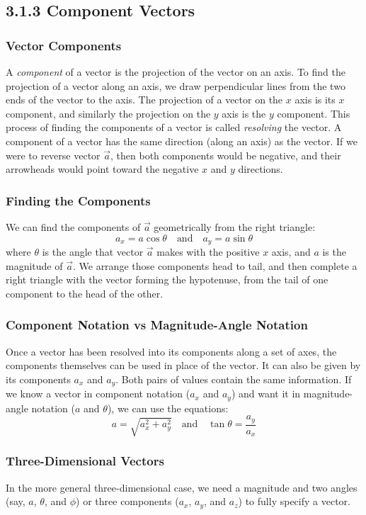 \documentclass{article}
\begin{document}
\subsection*{3.1.3 Component Vectors}
\subsubsection*{Vector Components}
A \textit{component} of a vector is the projection of the vector on an axis. To find the projection of a vector along an axis, we draw perpendicular lines from the two ends of the vector to the axis.
The projection of a vector on the $x$ axis is its $x$ component, and similarly the projection on the $y$ axis is the $y$ component.
This process of finding the components of a vector is called \textit{resolving} the vector.
A component of a vector has the same direction (along an axis) as the vector.
If we were to reverse vector $\vec{a}$, then both components would be negative, and their arrowheads would point toward the negative $x$ and $y$ directions.

\subsubsection*{Finding the Components}
We can find the components of $\vec{a}$ geometrically from the right triangle:
\[
a_x = a \cos \theta \quad \text{and} \quad a_y = a \sin \theta
\]
where $\theta$ is the angle that vector $\vec{a}$ makes with the positive $x$ axis, and $a$ is the magnitude of $\vec{a}$.
We arrange those components head to tail, and then complete a right triangle with the vector forming the hypotenuse, from the tail of one component to the head of the other.

\subsubsection*{Component Notation vs Magnitude-Angle Notation}
Once a vector has been resolved into its components along a set of axes, the components themselves can be used in place of the vector.
It can also be given by its components $a_x$ and $a_y$. Both pairs of values contain the same information. If we know a vector in component notation ($a_x$ and $a_y$) and want it in magnitude-angle notation ($a$ and $\theta$), we can use the equations:
\[
a = \sqrt{a_x^2 + a_y^2} \quad \text{and} \quad \tan \theta = \frac{a_y}{a_x}
\]

\subsubsection*{Three-Dimensional Vectors}
In the more general three-dimensional case, we need a magnitude and two angles (say, $a$, $\theta$, and $\phi$) or three components ($a_x$, $a_y$, and $a_z$) to fully specify a vector.
\end{document}
